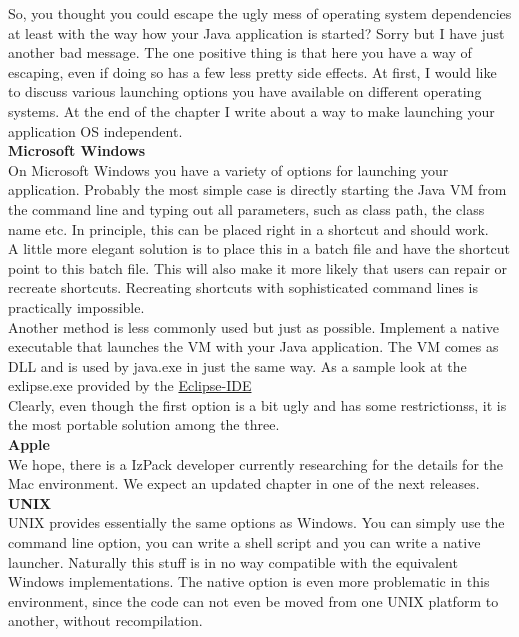 So, you thought you could escape the ugly mess of operating system
dependencies at least with the way how your Java application is started?
Sorry but I have just another bad message. The one positive thing is
that here you have a way of escaping, even if doing so has a few less
pretty side effects. At first, I would like to discuss various launching
options you have available on different operating systems. At the end of
the chapter I write about a way to make launching your application OS
independent.\\

\textbf{Microsoft Windows}\\

On Microsoft Windows you have a variety of options for launching your
application. Probably the most simple case is directly starting the Java
VM from the command line and typing out all parameters, such as class
path, the class name etc. In principle, this can be placed right in a
shortcut and should work.\\

A little more elegant solution is to place this in a batch file and have
the shortcut point to this batch file. This will also make it more
likely that users can repair or recreate shortcuts. Recreating shortcuts
with sophisticated command lines is practically impossible.\\

Another method is less commonly used but just as possible. Implement a
native executable that launches the VM with your Java application. The
VM comes as DLL and is used by java.exe in just the same way.
As a sample look at the exlipse.exe provided by the \href{http://www.eclipse.org}{Eclipse-IDE}\\

Clearly, even though the first option is a bit ugly and has some
restrictionss, it is the most portable solution among the three.\\

\textbf{Apple}\\

We hope, there is a IzPack developer currently researching
for the details for the Mac environment. We expect
an updated chapter in one of the next releases.\\

\textbf{UNIX}\\

UNIX provides essentially the same options as Windows. You can simply
use the command line option, you can write a shell script and you can
write a native launcher. Naturally this stuff is in no way compatible
with the equivalent Windows implementations. The native option is even
more problematic in this environment, since the code can not even be
moved from one UNIX platform to another, without recompilation.\\

